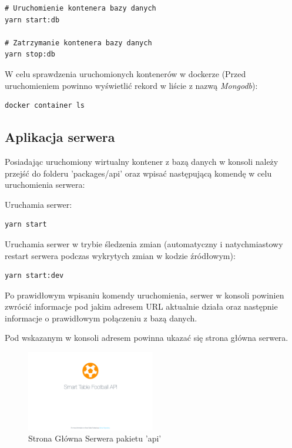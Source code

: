 \begin{lstlisting}
# Uruchomienie kontenera bazy danych
yarn start:db

# Zatrzymanie kontenera bazy danych
yarn stop:db
\end{lstlisting}

W celu sprawdzenia uruchomionych kontenerów w dockerze (Przed uruchomieniem powinno wyświetlić rekord w liście z nazwą \textit{Mongodb}):

\begin{lstlisting}
docker container ls
\end{lstlisting}

\subsection{Aplikacja serwera}

Posiadając uruchomiony wirtualny kontener z bazą danych w konsoli należy przejść do folderu 'packages/api' oraz wpisać następującą komendę w celu uruchomienia serwera:

Uruchamia serwer:
\begin{lstlisting}
yarn start
\end{lstlisting}

Uruchamia serwer w trybie śledzenia zmian (automatyczny i natychmiastowy restart serwera podczas wykrytych zmian w kodzie źródłowym):
\begin{lstlisting}
yarn start:dev
\end{lstlisting}

Po prawidłowym wpisaniu komendy uruchomienia, serwer w konsoli powinien zwrócić informacje pod jakim adresem URL aktualnie działa oraz następnie informacje o prawidłowym połączeniu z bazą danych.


Pod wskazanym w konsoli adresem powinna ukazać się strona główna serwera.

\begin{figure}[h!]
  \centering
    \includegraphics[width=0.5\textwidth]{images/api/stf_api_home.png}
  \caption{Strona Główna Serwera pakietu 'api'}
  \label{fig:mobile}
\end{figure}


